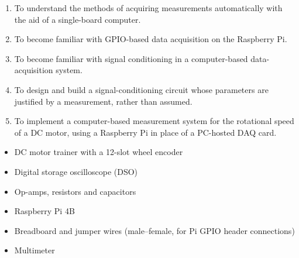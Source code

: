 
\begin{objectives}
  \begin{enumerate}
    \item To understand the methods of acquiring measurements automatically with the aid of a single-board computer.
    \item To become familiar with GPIO-based data acquisition on the Raspberry Pi.
    \item To become familiar with signal conditioning in a computer-based data-acquisition system.
    \item To design and build a signal-conditioning circuit whose parameters are justified by a measurement, rather than assumed.
    \item To implement a computer-based measurement system for the rotational speed of a DC motor, using a Raspberry Pi in place of a PC-hosted DAQ card.
  \end{enumerate}
\end{objectives}

\begin{equipment}
  \begin{itemize}
    \item DC motor trainer with a 12-slot wheel encoder
    \item Digital storage oscilloscope (DSO)
    \item Op-amps, resistors and capacitors
    \item Raspberry Pi 4B
    \item Breadboard and jumper wires (male--female, for Pi GPIO header connections)
    \item Multimeter
  \end{itemize}
\end{equipment}

